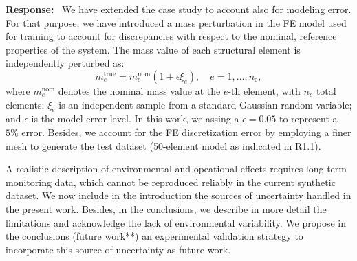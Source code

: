 \documentclass[11pt]{article}
\newenvironment{response}{\par\smallskip\noindent\color{resp}\textbf{Response:}\ }{\par}
\begin{document}
\begin{response}
We have extended the case study to account also for modeling error.
For that purpose, we have introduced a mass perturbation in the FE model used for training to account for discrepancies with respect to the nominal, reference properties of the system. 
The mass value of each structural element is independently perturbed as: 
\begin{equation}
	m_e^{\text{true}} = m_e^{\text{nom}} \left(1 + \epsilon \xi_e\right), \quad e = 1, \dots, n_{\text{e}},
	\label{eq:modeling_error}
\end{equation}
where $m_e^{\text{nom}}$ denotes the nominal mass value at the $e$-th element, with $n_{e}$ total elements; $\xi_e$ is an independent sample from a standard Gaussian random variable; and $\epsilon$ is the model-error level. 
In this work, we assing a $\epsilon = 0.05$ to represent a $5\%$ error. 
Besides, we account for the FE discretization error by employing a finer mesh to generate the test dataset (50-element model as indicated in R1.1). 

A realistic description of environmental and opeational effects requires long-term monitoring data, which cannot be reproduced reliably in the current synthetic dataset. 
We now include in the introduction the sources of uncertainty handled in the present work. 
Besides, in the conclusions, we describe in more detail the limitations and acknowledge the lack of environmental variability. 
We propose in the conclusions (future work**) an experimental validation strategy to incorporate this source of uncertainty as future work.



\end{response}
\end{document}
